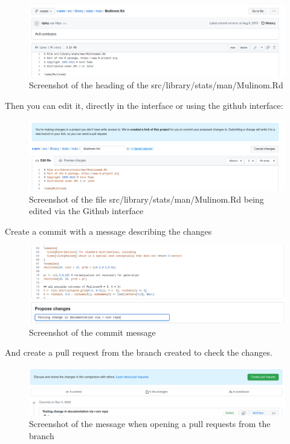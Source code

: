 \documentclass[
]{book}
\begin{document}
\begin{figure}
\centering
\includegraphics{img/rsvn_file_to_edit.png}
\caption{Screenshot of the heading of the src/library/stats/man/Mulinom.Rd}
\end{figure}

Then you can edit it, directly in the interface or using the github interface:

\begin{figure}
\centering
\includegraphics{img/rsvn_edit_file.png}
\caption{Screenshot of the file src/library/stats/man/Mulinom.Rd being edited via the Github interface}
\end{figure}

Create a commit with a message describing the changes

\begin{figure}
\centering
\includegraphics{img/rsvn_commit_message.png}
\caption{Screenshot of the commit message}
\end{figure}

And create a pull request from the branch created to check the changes.

\begin{figure}
\centering
\includegraphics{img/rsvn_commit_pre_PR.png}
\caption{Screenshot of the message when opening a pull requests from the branch}
\end{figure}
\end{document}
